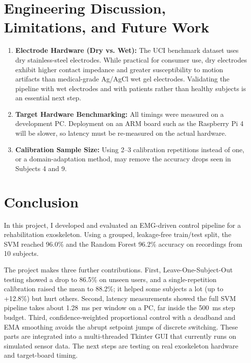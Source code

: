 \documentclass[11pt,a4paper]{article}
\begin{document}
\section{Engineering Discussion, Limitations, and Future Work}
\begin{enumerate}
    \item \textbf{Electrode Hardware (Dry vs. Wet):} The UCI benchmark dataset uses dry stainless-steel electrodes. While practical for consumer use, dry electrodes exhibit higher contact impedance and greater susceptibility to motion artifacts than medical-grade Ag/AgCl wet gel electrodes. Validating the pipeline with wet electrodes and with patients rather than healthy subjects is an essential next step.
    \item \textbf{Target Hardware Benchmarking:} All timings were measured on a development PC. Deployment on an ARM board such as the Raspberry Pi 4 will be slower, so latency must be re-measured on the actual hardware.
    \item \textbf{Calibration Sample Size:} Using 2--3 calibration repetitions instead of one, or a domain-adaptation method, may remove the accuracy drops seen in Subjects 4 and 9.
\end{enumerate}

\section{Conclusion}
In this project, I developed and evaluated an EMG-driven control pipeline for a rehabilitation exoskeleton. Using a grouped, leakage-free train/test split, the SVM reached 96.0\% and the Random Forest 96.2\% accuracy on recordings from 10 subjects.

The project makes three further contributions. First, Leave-One-Subject-Out testing showed a drop to 86.5\% on unseen users, and a single-repetition calibration raised the mean to 88.2\%; it helped some subjects a lot (up to +12.8\%) but hurt others. Second, latency measurements showed the full SVM pipeline takes about 1.28~ms per window on a PC, far inside the 500~ms step budget. Third, confidence-weighted proportional control with a deadband and EMA smoothing avoids the abrupt setpoint jumps of discrete switching. These parts are integrated into a multi-threaded Tkinter GUI that currently runs on simulated sensor data. The next steps are testing on real exoskeleton hardware and target-board timing.
\end{document}
